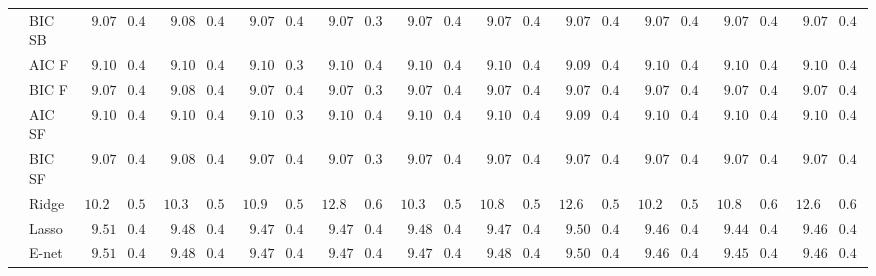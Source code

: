 \begin{tabular}{ll|ll|llllll|llllll|llllll}
 & BIC SB  & $\phantom{0}9.07$ & $0.40$ & $\phantom{0}9.08$ & $0.40$ & $\phantom{0}9.07$ & $0.40$ & $\phantom{0}9.07$ & $0.39$ & $\phantom{0}9.07$ & $0.40$ & $\phantom{0}9.07$ & $0.40$ & $\phantom{0}9.07$ & $0.40$ & $\phantom{0}9.07$ & $0.40$ & $\phantom{0}9.07$ & $0.40$ & $\phantom{0}9.07$ & $0.40$ \\
 & AIC F  & $\phantom{0}9.10$ & $0.40$ & $\phantom{0}9.10$ & $0.40$ & $\phantom{0}9.10$ & $0.39$ & $\phantom{0}9.10$ & $0.40$ & $\phantom{0}9.10$ & $0.40$ & $\phantom{0}9.10$ & $0.40$ & $\phantom{0}9.09$ & $0.40$ & $\phantom{0}9.10$ & $0.40$ & $\phantom{0}9.10$ & $0.40$ & $\phantom{0}9.10$ & $0.40$ \\
 & BIC F  & $\phantom{0}9.07$ & $0.40$ & $\phantom{0}9.08$ & $0.40$ & $\phantom{0}9.07$ & $0.40$ & $\phantom{0}9.07$ & $0.39$ & $\phantom{0}9.07$ & $0.40$ & $\phantom{0}9.07$ & $0.40$ & $\phantom{0}9.07$ & $0.40$ & $\phantom{0}9.07$ & $0.40$ & $\phantom{0}9.07$ & $0.40$ & $\phantom{0}9.07$ & $0.40$ \\
 & AIC SF  & $\phantom{0}9.10$ & $0.40$ & $\phantom{0}9.10$ & $0.40$ & $\phantom{0}9.10$ & $0.39$ & $\phantom{0}9.10$ & $0.40$ & $\phantom{0}9.10$ & $0.40$ & $\phantom{0}9.10$ & $0.40$ & $\phantom{0}9.09$ & $0.40$ & $\phantom{0}9.10$ & $0.40$ & $\phantom{0}9.10$ & $0.40$ & $\phantom{0}9.10$ & $0.40$ \\
 & BIC SF  & $\phantom{0}9.07$ & $0.40$ & $\phantom{0}9.08$ & $0.40$ & $\phantom{0}9.07$ & $0.40$ & $\phantom{0}9.07$ & $0.39$ & $\phantom{0}9.07$ & $0.40$ & $\phantom{0}9.07$ & $0.40$ & $\phantom{0}9.07$ & $0.40$ & $\phantom{0}9.07$ & $0.40$ & $\phantom{0}9.07$ & $0.40$ & $\phantom{0}9.07$ & $0.40$ \\
 & Ridge  & $10.24$ & $0.50$ & $10.38$ & $0.50$ & $10.93$ & $0.58$ & $12.85$ & $0.64$ & $10.34$ & $0.52$ & $10.85$ & $0.58$ & $12.68$ & $0.58$ & $10.29$ & $0.52$ & $10.82$ & $0.61$ & $12.63$ & $0.66$ \\
 & Lasso  & $\phantom{0}9.51$ & $0.45$ & $\phantom{0}9.48$ & $0.44$ & $\phantom{0}9.47$ & $0.45$ & $\phantom{0}9.47$ & $0.45$ & $\phantom{0}9.48$ & $0.46$ & $\phantom{0}9.47$ & $0.44$ & $\phantom{0}9.50$ & $0.43$ & $\phantom{0}9.46$ & $0.47$ & $\phantom{0}9.44$ & $0.45$ & $\phantom{0}9.46$ & $0.45$ \\
 & E-net  & $\phantom{0}9.51$ & $0.45$ & $\phantom{0}9.48$ & $0.44$ & $\phantom{0}9.47$ & $0.45$ & $\phantom{0}9.47$ & $0.45$ & $\phantom{0}9.47$ & $0.46$ & $\phantom{0}9.48$ & $0.45$ & $\phantom{0}9.50$ & $0.44$ & $\phantom{0}9.46$ & $0.47$ & $\phantom{0}9.45$ & $0.46$ & $\phantom{0}9.46$ & $0.44$ \\

\end{tabular}
